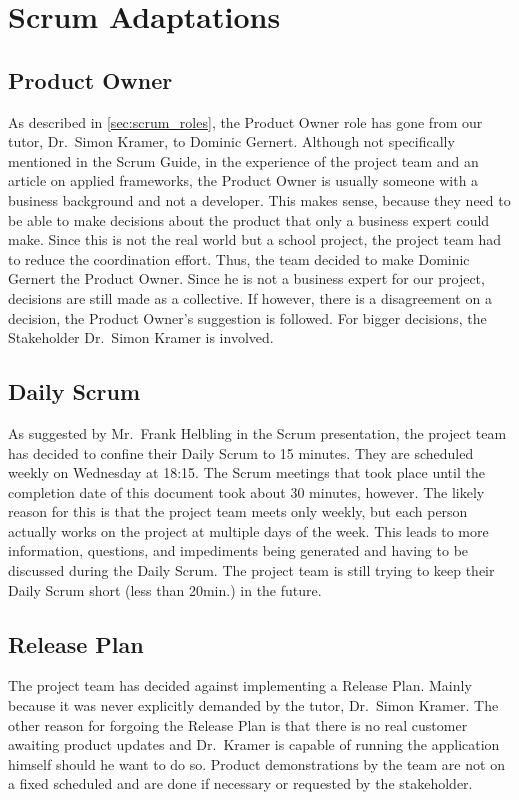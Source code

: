 \section{Scrum Adaptations}\label{sec:scrum-adaptations}
\subsection{Product Owner}\label{subsec:product-owner}
As described in \autoref{sec:scrum_roles}, the Product Owner role has gone from our tutor, Dr.\ Simon Kramer, to Dominic Gernert.
Although not specifically mentioned in the Scrum Guide\cite{scrum_guide}, in the experience
of the project team and an article on applied frameworks\cite{applied_frameworks_po}, the Product Owner is usually someone with a business background and not a developer.
This makes sense, because they need to be able to make decisions about the product that only a business expert could make.
Since this is not the real world but a school project, the project team had to reduce the coordination effort.
Thus, the team decided to make Dominic Gernert the Product Owner.
Since he is not a business expert for our project, decisions are still made as a collective.
If however, there is a disagreement on a decision, the Product Owner's suggestion is followed.
For bigger decisions, the Stakeholder Dr.\ Simon Kramer is involved.
\subsection{Daily Scrum}\label{subsec:daily-scrum}
As suggested by Mr.\ Frank Helbling in the Scrum presentation\cite{helbling_scrum3}, the project team has decided to confine their Daily Scrum to 15 minutes.
They are scheduled weekly on Wednesday at 18:15.
The Scrum meetings that took place until the completion date of this document took about 30 minutes, however.
The likely reason for this is that the project team meets only weekly,
but each person actually works on the project at multiple days of the week.
This leads to more information, questions, and impediments being generated and having to be discussed during the Daily Scrum.
The project team is still trying to keep their Daily Scrum short (less than 20min.) in the future.
\subsection{Release Plan}\label{subsec:release-plan}
The project team has decided against implementing a Release Plan.
Mainly because it was never explicitly demanded by the tutor, Dr.\ Simon Kramer.
The other reason for forgoing the Release Plan is that
there is no real customer awaiting product updates and Dr.\ Kramer is capable of running the application himself should he want to do so.
Product demonstrations by the team are not on a fixed scheduled and
are done if necessary or requested by the stakeholder.

